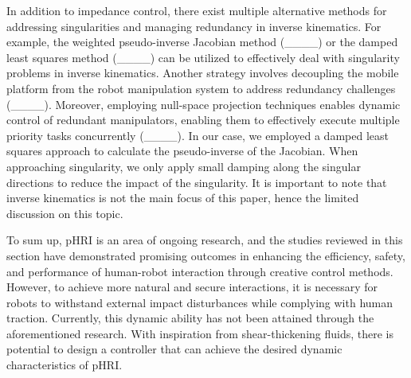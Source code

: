 In addition to impedance control, there exist multiple alternative methods for addressing singularities and managing redundancy in inverse kinematics. For example, the weighted pseudo-inverse Jacobian method (____) or the damped least squares method (____) can be utilized to effectively deal with singularity problems in inverse kinematics. Another strategy involves decoupling the mobile platform from the robot manipulation system to address redundancy challenges (____). Moreover, employing null-space projection techniques enables dynamic control of redundant manipulators, enabling them to effectively execute multiple priority tasks concurrently (____). In our case, we employed a damped least squares approach to calculate the pseudo-inverse of the Jacobian. When approaching singularity, we only apply small damping along the singular directions to reduce the impact of the singularity. It is important to note that inverse kinematics is not the main focus of this paper, hence the limited discussion on this topic.

To sum up, pHRI is an area of ongoing research, and the studies reviewed in this section have demonstrated promising outcomes in enhancing the efficiency, safety, and performance of human-robot interaction through creative control methods. However, to achieve more natural and secure interactions, it is necessary for robots to withstand external impact disturbances while complying with human traction. Currently, this dynamic ability has not been attained through the aforementioned research. With inspiration from shear-thickening fluids, there is potential to design a controller that can achieve the desired dynamic characteristics of pHRI.




